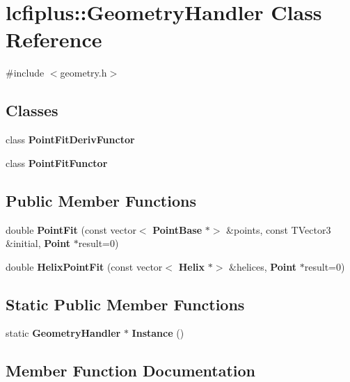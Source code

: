 \section{lcfiplus\+:\+:Geometry\+Handler Class Reference}
\label{classlcfiplus_1_1GeometryHandler}


{\ttfamily \#include $<$geometry.\+h$>$}

\subsection*{Classes}
\begin{DoxyCompactItemize}
\item 
class \textbf{ Point\+Fit\+Deriv\+Functor}
\item 
class \textbf{ Point\+Fit\+Functor}
\end{DoxyCompactItemize}
\subsection*{Public Member Functions}
\begin{DoxyCompactItemize}
\item 
double \textbf{ Point\+Fit} (const vector$<$ \textbf{ Point\+Base} $\ast$$>$ \&points, const T\+Vector3 \&initial, \textbf{ Point} $\ast$result=0)
\item 
double \textbf{ Helix\+Point\+Fit} (const vector$<$ \textbf{ Helix} $\ast$$>$ \&helices, \textbf{ Point} $\ast$result=0)
\end{DoxyCompactItemize}
\subsection*{Static Public Member Functions}
\begin{DoxyCompactItemize}
\item 
static \textbf{ Geometry\+Handler} $\ast$ \textbf{ Instance} ()
\end{DoxyCompactItemize}


\subsection{Member Function Documentation}
\mbox{\label{classlcfiplus_1_1GeometryHandler_a9029010066d4fd39ee83490c5ba2be2f}} 
